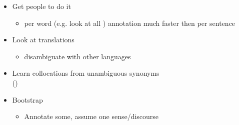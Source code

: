 \documentclass[a4paper,landscape,headrule,footrule,xetex]{foils}
\begin{document}
\begin{itemize}
\item Get people to do it
  \begin{itemize}
  \item per word (e.g. look at all ) annotation much faster then per sentence
  \end{itemize}
\item Look at translations
  \begin{itemize}
  \item disambiguate with other languages
  \end{itemize}
\item Learn collocations from unambiguous synonyms 
\\ ()
\item Bootstrap
  \begin{itemize}
  \item Annotate some, assume one sense/discourse
  \end{itemize}
\end{itemize}



\end{document}
